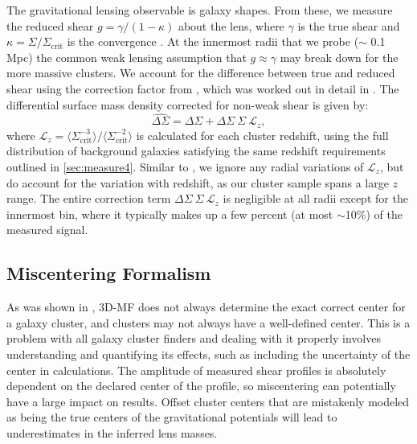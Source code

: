 The gravitational lensing observable is galaxy shapes. From these, we measure the reduced shear $g = \gamma / (1-\kappa)$ about the lens, where $\gamma$ is the true shear and $\kappa = \Sigma / \Sigma_{\mathrm{crit}}$ is the convergence \citep[as before, calculated using the \ac{NFW} halo formalism in][]{Wright00}. At the innermost radii that we probe ($\sim$ 0.1 Mpc) the common weak lensing assumption that $g \approx \gamma$ may break down for the more massive clusters. We account for the difference between true and reduced shear using the correction factor from \citet{Johnston07}, which was worked out in detail in \citet{Mandelbaum06}. The differential surface mass density corrected for non-weak shear is given by:
\begin{equation}
\widehat{\Delta\Sigma} = \Delta\Sigma + \Delta\Sigma \ \Sigma \ \mathcal{L}_z,
\end{equation}
where $\mathcal{L}_z = \langle \Sigma_{\mathrm{crit}}^{-3} \rangle / \langle \Sigma_{\mathrm{crit}}^{-2} \rangle$ is calculated for each cluster redshift, using the full distribution of background galaxies satisfying the same redshift requirements outlined in \autoref{sec:measure4}. Similar to \citet{Leauthaud10}, we ignore any radial variations of $\mathcal{L}_z$, but do account for the variation with redshift, as our cluster sample spans a large $z$ range. The entire correction term $\Delta\Sigma \ \Sigma \ \mathcal{L}_z$ is negligible at all radii except for the innermost bin, where it typically makes up a few percent (at most $\sim$10\%) of the measured signal.


\subsection{Miscentering Formalism}
\label{sec:miscentering4}

As was shown in \citet{Milkeraitis10}, \ac{3D-MF} does not always determine the exact correct center for a galaxy cluster, and clusters may not always have a well-defined center. This is a problem with all galaxy cluster finders and dealing with it properly involves understanding and quantifying its effects, such as including the uncertainty of the center in calculations. The amplitude of measured shear profiles is absolutely dependent on the declared center of the profile, so miscentering can potentially have a large impact on results. Offset cluster centers that are mistakenly modeled as being the true centers of the gravitational potentials will lead to underestimates in the inferred lens masses.


